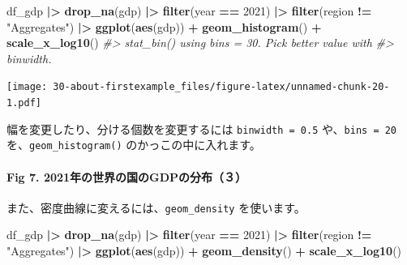 \documentclass[
  xelatex, ja=standard]{bxjsbook}
\newenvironment{Shaded}{\begin{snugshade}}{\end{snugshade}}
\newcommand{\CommentTok}[1]{\textcolor[rgb]{0.56,0.35,0.01}{\textit{#1}}}
\newcommand{\DecValTok}[1]{\textcolor[rgb]{0.00,0.00,0.81}{#1}}
\newcommand{\FunctionTok}[1]{\textcolor[rgb]{0.13,0.29,0.53}{\textbf{#1}}}
\newcommand{\NormalTok}[1]{#1}
\newcommand{\SpecialCharTok}[1]{\textcolor[rgb]{0.81,0.36,0.00}{\textbf{#1}}}
\newcommand{\StringTok}[1]{\textcolor[rgb]{0.31,0.60,0.02}{#1}}
\theoremstyle{definition}
\theoremstyle{definition}
\theoremstyle{definition}
\theoremstyle{definition}
\theoremstyle{remark}
\begin{document}
\begin{Shaded}
\begin{Highlighting}[]
\NormalTok{df\_gdp }\SpecialCharTok{|\textgreater{}} \FunctionTok{drop\_na}\NormalTok{(gdp) }\SpecialCharTok{|\textgreater{}} 
  \FunctionTok{filter}\NormalTok{(year }\SpecialCharTok{==} \DecValTok{2021}\NormalTok{) }\SpecialCharTok{|\textgreater{}} \FunctionTok{filter}\NormalTok{(region }\SpecialCharTok{!=} \StringTok{"Aggregates"}\NormalTok{) }\SpecialCharTok{|\textgreater{}}
  \FunctionTok{ggplot}\NormalTok{(}\FunctionTok{aes}\NormalTok{(gdp)) }\SpecialCharTok{+} \FunctionTok{geom\_histogram}\NormalTok{() }\SpecialCharTok{+} \FunctionTok{scale\_x\_log10}\NormalTok{()}
\CommentTok{\#\textgreater{} \textasciigrave{}stat\_bin()\textasciigrave{} using \textasciigrave{}bins = 30\textasciigrave{}. Pick better value with}
\CommentTok{\#\textgreater{} \textasciigrave{}binwidth\textasciigrave{}.}
\end{Highlighting}
\end{Shaded}

\texttt{[image: 30-about-firstexample\_files/figure-latex/unnamed-chunk-20-1.pdf]}

幅を変更したり、分ける個数を変更するには \texttt{binwidth\ =\ 0.5} や、\texttt{bins\ =\ 20} を、\texttt{geom\_histogram()} のかっこの中に入れます。

\hypertarget{fig-7.-2021ux5e74ux306eux4e16ux754cux306eux56fdux306egdpux306eux5206ux5e03uxff13-1}{%
\paragraph{Fig 7. 2021年の世界の国のGDPの分布（３）}\label{fig-7.-2021ux5e74ux306eux4e16ux754cux306eux56fdux306egdpux306eux5206ux5e03uxff13-1}}

また、密度曲線に変えるには、\texttt{geom\_density} を使います。

\begin{Shaded}
\begin{Highlighting}[]
\NormalTok{df\_gdp }\SpecialCharTok{|\textgreater{}} \FunctionTok{drop\_na}\NormalTok{(gdp) }\SpecialCharTok{|\textgreater{}} 
  \FunctionTok{filter}\NormalTok{(year }\SpecialCharTok{==} \DecValTok{2021}\NormalTok{) }\SpecialCharTok{|\textgreater{}} \FunctionTok{filter}\NormalTok{(region }\SpecialCharTok{!=} \StringTok{"Aggregates"}\NormalTok{) }\SpecialCharTok{|\textgreater{}}
  \FunctionTok{ggplot}\NormalTok{(}\FunctionTok{aes}\NormalTok{(gdp)) }\SpecialCharTok{+} \FunctionTok{geom\_density}\NormalTok{() }\SpecialCharTok{+} \FunctionTok{scale\_x\_log10}\NormalTok{()}
\end{Highlighting}
\end{Shaded}
\end{document}
